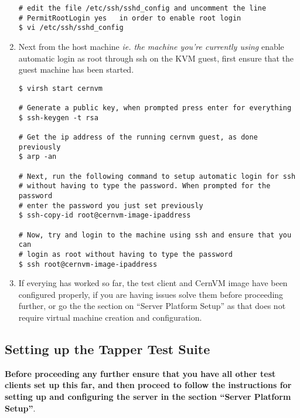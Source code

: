 \begin{enumerate}
\begin{lstlisting}
# edit the file /etc/ssh/sshd_config and uncomment the line 
# PermitRootLogin yes	in order to enable root login
$ vi /etc/ssh/sshd_config
\end{lstlisting}

\item Next from the host machine \emph{ie. the machine you're currently using} enable automatic login as root 
through ssh on the KVM guest, first ensure that the guest machine has been started.
\lstset{caption= Enable Automatic SSH Root Login}
\begin{lstlisting}
$ virsh start cernvm

# Generate a public key, when prompted press enter for everything
$ ssh-keygen -t rsa

# Get the ip address of the running cernvm guest, as done previously
$ arp -an

# Next, run the following command to setup automatic login for ssh
# without having to type the password. When prompted for the password
# enter the password you just set previously
$ ssh-copy-id root@cernvm-image-ipaddress
		
# Now, try and login to the machine using ssh and ensure that you can
# login as root without having to type the password
$ ssh root@cernvm-image-ipaddress
\end{lstlisting}

\item If everying has worked so far, the test client and CernVM image have been configured properly, if you are
having issues solve them before proceeding further, or go the the section on ``Server Platform Setup'' as that
does not require virtual machine creation and configuration.
\end{enumerate}

\subsection{Setting up the Tapper Test Suite}
\item {\bf Before proceeding any further ensure that you have all other test clients set up this far, and then proceed
to follow the instructions for setting up and configuring the \tapper server in the section ``Server Platform Setup''}.
